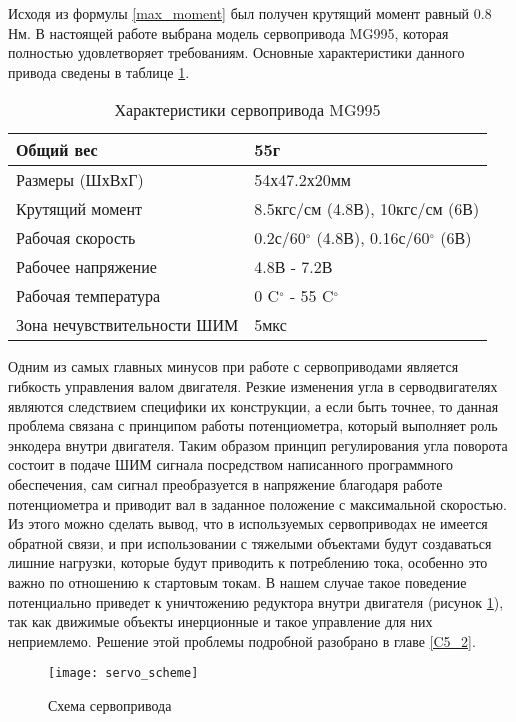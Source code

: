 Исходя из формулы \ref{max_moment} был получен крутящий момент равный 0.8 Нм. В настоящей работе выбрана модель сервопривода MG995, которая полностью удовлетворяет требованиям. Основные характеристики данного привода сведены в таблице \ref{servoParam}.


\begin{table}[h]
	\begin{center}
		\caption{Характеристики сервопривода MG995}
		\label{servoParam}
		\begin{tabular}{| l | l |}
			\hline
			Общий вес   &    55г \\ \hline
			Размеры (ШхВхГ) & 54х47.2х20мм\\ \hline
			Крутящий момент & 8.5кгс/см (4.8В), 10кгс/см (6В) \\ \hline
			Рабочая скорость & 0.2с/60$^{\circ}$ (4.8В), 0.16с/60$^{\circ}$ (6В) \\ \hline
			Рабочее напряжение & 4.8В - 7.2В \\ \hline
			Рабочая температура & 0 C$^{\circ}$  - 55 C$^{\circ}$ \\ \hline
			Зона нечувствительности ШИМ & 5мкс \\ \hline
		\end{tabular}
	\end{center}
\end{table} 

Одним из самых главных минусов при работе с сервоприводами является гибкость управления валом двигателя. Резкие изменения угла в серводвигателях являются следствием специфики их конструкции, а если быть точнее, то данная проблема связана с принципом работы потенциометра, который выполняет роль энкодера внутри двигателя. Таким образом принцип регулирования угла поворота состоит в подаче ШИМ сигнала посредством написанного программного обеспечения, сам сигнал преобразуется в напряжение благодаря работе потенциометра и приводит вал в заданное положение с максимальной скоростью. Из этого можно сделать вывод, что в используемых  сервоприводах не имеется обратной связи, и при использовании с тяжелыми объектами будут создаваться лишние нагрузки, которые будут приводить к потреблению тока, особенно это важно по отношению к стартовым токам. В нашем случае такое поведение потенциально приведет к уничтожению редуктора внутри двигателя (рисунок \ref{servo_scheme}), так как движимые объекты инерционные и такое управление для них неприемлемо. Решение этой проблемы подробной разобрано в главе \ref{C5_2}. 

\begin{figure}[h!]
	\begin{center}
		\texttt{[image: servo\_scheme]}
		\caption{Схема сервопривода}
		\label{servo_scheme}
	\end{center}
\end{figure}

